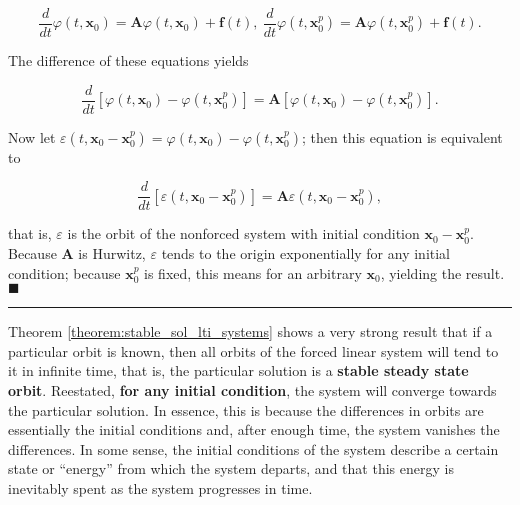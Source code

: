 \begin{equation} \dfrac{d}{dt}\varphi\left(t,\mathbf{x}_0\right) = \mathbf{A} \varphi\left(t,\mathbf{x}_0\right) + \mathbf{f}(t),\ \dfrac{d}{dt}\varphi\left(t,\mathbf{x}_0^p\right) = \mathbf{A} \varphi\left(t,\mathbf{x}_0^p\right) + \mathbf{f}(t). \end{equation}

	The difference of these equations yields

\begin{equation} \dfrac{d}{dt} \left[ \varphi\left(t,\mathbf{x}_0\right) - \varphi\left(t,\mathbf{x}_0^p\right)\right] = \mathbf{A}\left[ \varphi\left(t,\mathbf{x}_0\right) - \varphi\left(t,\mathbf{x}_0^p\right)\right]. \end{equation}

	Now let $\varepsilon\left(t,\mathbf{x}_0 - \mathbf{x}_0^p\right)  = \varphi\left(t,\mathbf{x}_0\right) - \varphi\left(t,\mathbf{x}_0^p\right)$; then this equation is equivalent to

\begin{equation} \dfrac{d}{dt} \left[ \varepsilon\left(t,\mathbf{x}_0 - \mathbf{x}_0^p\right)\right] = \mathbf{A}\varepsilon\left(t,\mathbf{x}_0 - \mathbf{x}_0^p\right), \end{equation}

	\noindent that is, $\varepsilon$ is the orbit of the nonforced system with initial condition $\mathbf{x}_0 - \mathbf{x}_0^p$. Because $\mathbf{A}$ is Hurwitz, $\varepsilon$ tends to the origin exponentially for any initial condition; because $\mathbf{x}_0^p$ is fixed, this means for an arbitrary $\mathbf{x}_0$, yielding the result.
\hfill$\blacksquare$
\vspace{5mm}
\hrule
\vspace{5mm} %

	Theorem \ref{theorem:stable_sol_lti_systems} shows a very strong result that if a particular orbit is known, then all orbits of the forced linear system will tend to it in infinite time, that is, the particular solution is a \textbf{stable steady state orbit}. Reestated, \textbf{for any initial condition}, the system will converge towards the particular solution. In essence, this is because the differences in orbits are essentially the initial conditions and, after enough time, the system vanishes the differences. In some sense, the initial conditions of the system describe a certain state or ``energy'' from which the system departs, and that this energy is inevitably spent as the system progresses in time.

